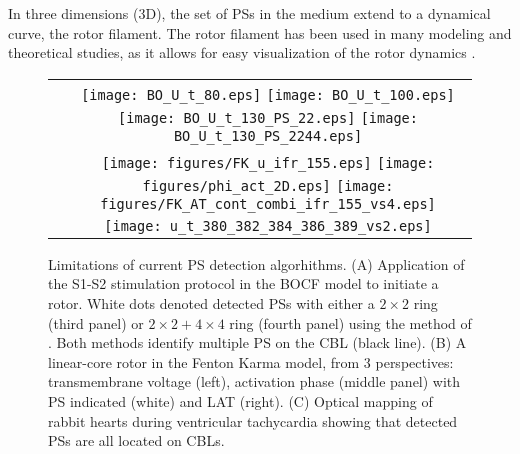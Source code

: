 \documentclass{article}
\begin{document}
In three dimensions (3D), the set of PSs in the medium extend to a dynamical curve, the rotor filament. The rotor filament has been used in many modeling and theoretical studies, as it allows for easy visualization of the rotor dynamics \citep{Clayton:2005,Wellner:2002,Verschelde:2007,Dierckx:2012}. 

\begin{figure}
 \begin{tabular}{ c c}
\raisebox{3.1cm}{\textbf{A}}  &  \texttt{[image: BO\_U\_t\_80.eps]}
 \texttt{[image: BO\_U\_t\_100.eps]}
     \texttt{[image: BO\_U\_t\_130\_PS\_22.eps]}
    \texttt{[image: BO\_U\_t\_130\_PS\_2244.eps]} 
 \\
\raisebox{4.1cm}{\textbf{B}}  &  \texttt{[image: figures/FK\_u\_ifr\_155.eps]}
   \texttt{[image: figures/phi\_act\_2D.eps]}
    \texttt{[image: figures/FK\_AT\_cont\_combi\_ifr\_155\_vs4.eps]}\\
    \raisebox{5cm}{\textbf{C}}&
    \texttt{[image: u\_t\_380\_382\_384\_386\_389\_vs2.eps]}
 
\end{tabular}
    \caption{Limitations of current PS detection algorhithms. (A) Application of the S1-S2 stimulation protocol in the BOCF \citep{BuenoOrovio:2008} model to initiate a rotor. White dots denoted detected PSs with either a $2\times2$ ring (third panel) or $2\times2+4\times4$ ring (fourth panel) using the method of \cite{Kuklik:2017}. Both methods identify multiple PS on the CBL (black line). %
     (B) A linear-core rotor in the Fenton Karma model, from 3 perspectives: transmembrane voltage (left), activation phase (middle panel) with PS indicated (white) and LAT (right). (C) Optical mapping of rabbit hearts during ventricular tachycardia showing that detected PSs are all located on CBLs.}
    \label{fig:problems}
\end{figure}
\end{document}
